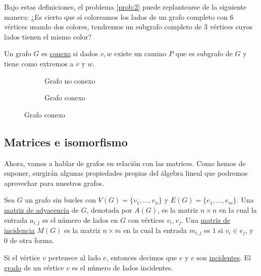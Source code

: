 \begin{marginfigure}
    \centering
    \caption{Ejemplo de grafo completo}
\end{marginfigure}

Bajo estas definiciones, el problema \ref{prob:2} puede replantearse de la siguiente manera: ¿Es cierto que si coloreamos los lados de un grafo completo con $6$ vértices usando dos colores, tendremos un subgrafo completo de $3$ vértices cuyos lados tienen el mismo color?

\begin{defn}
    Un grafo $G$ es \ul{conexo} si dados $v, w$ existe un camino $P$ que es subgrafo de $G$ y tiene como extremos a $v$ y $w$.
\end{defn}

\begin{figure}
    \begin{subfigure}[b]{0.5\textwidth}
    \centering
        \caption{Grafo no conexo}
    \end{subfigure}
    \hfill
    \begin{subfigure}[b]{0.5\textwidth}
    \centering
        \caption{Grafo conexo}
    \end{subfigure}
\end{figure}

\subsection{Matrices e isomorfismo}

Ahora, vamos a hablar de grafos en relación con las matrices. Como hemos de suponer, surgirán algunas propiedades propias del álgebra lineal que podremos aprovechar para nuestros grafos.

\begin{defn}
    Sea $G$ un grafo sin bucles con $V(G) = \{v_1, \dots, v_n\}$ y $E(G) = \{e_1, \dots, e_m\}$. Una \ul{matriz de adyacencia} de $G$, denotada por $A(G)$, es la matriz $n \times n$ en la cual la entrada $a_{i,j}$ es el número de lados en $G$ con vértices $v_i,v_j$. Una \ul{matriz de incidencia} $M(G)$ es la matriz $n \times m$ en la cual la entrada $m_{i,j}$ es $1$ si $v_i \in e_j$, y $0$ de otra forma.
    
    Si el vértice $v$ pertenece al lado $e$, entonces decimos que $v$ y $e$ son \ul{incidentes}. El \ul{grado} de un vértice $v$ es el número de lados incidentes.
\end{defn}

